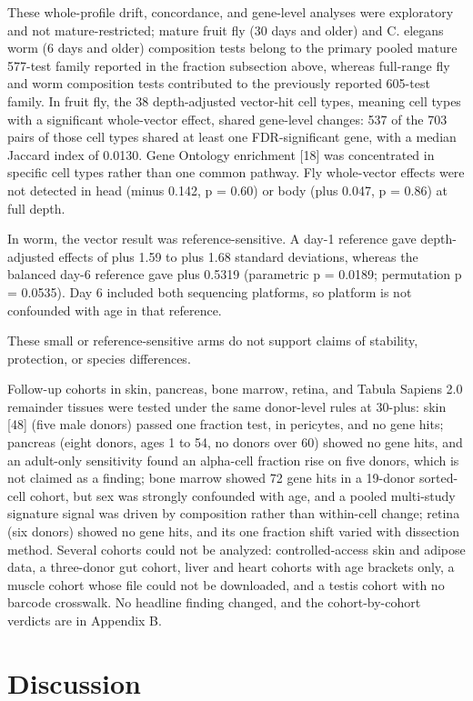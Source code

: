 \documentclass[11pt]{article}
\begin{document}
These whole-profile drift, concordance, and gene-level analyses were exploratory and not mature-restricted; mature fruit fly (30 days and older) and C. elegans worm (6 days and older) composition tests belong to the primary pooled mature 577-test family reported in the fraction subsection above, whereas full-range fly and worm composition tests contributed to the previously reported 605-test family. In fruit fly, the 38 depth-adjusted vector-hit cell types, meaning cell types with a significant whole-vector effect, shared gene-level changes: 537 of the 703 pairs of those cell types shared at least one FDR-significant gene, with a median Jaccard index of 0.0130. Gene Ontology enrichment [18] was concentrated in specific cell types rather than one common pathway. Fly whole-vector effects were not detected in head (minus 0.142, p = 0.60) or body (plus 0.047, p = 0.86) at full depth.

In worm, the vector result was reference-sensitive. A day-1 reference gave depth-adjusted effects of plus 1.59 to plus 1.68 standard deviations, whereas the balanced day-6 reference gave plus 0.5319 (parametric p = 0.0189; permutation p = 0.0535). Day 6 included both sequencing platforms, so platform is not confounded with age in that reference.

These small or reference-sensitive arms do not support claims of stability, protection, or species differences.

Follow-up cohorts in skin, pancreas, bone marrow, retina, and Tabula Sapiens 2.0 remainder tissues were tested under the same donor-level rules at 30-plus: skin [48] (five male donors) passed one fraction test, in pericytes, and no gene hits; pancreas (eight donors, ages 1 to 54, no donors over 60) showed no gene hits, and an adult-only sensitivity found an alpha-cell fraction rise on five donors, which is not claimed as a finding; bone marrow showed 72 gene hits in a 19-donor sorted-cell cohort, but sex was strongly confounded with age, and a pooled multi-study signature signal was driven by composition rather than within-cell change; retina (six donors) showed no gene hits, and its one fraction shift varied with dissection method. Several cohorts could not be analyzed: controlled-access skin and adipose data, a three-donor gut cohort, liver and heart cohorts with age brackets only, a muscle cohort whose file could not be downloaded, and a testis cohort with no barcode crosswalk. No headline finding changed, and the cohort-by-cohort verdicts are in Appendix B.

\section*{Discussion}
\end{document}

